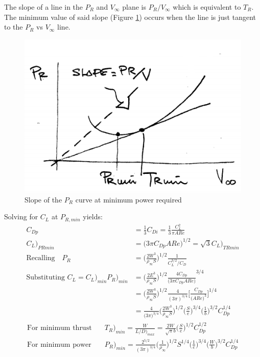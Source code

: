 \documentclass[draft=false, titlepage]{article}
\begin{document}
The slope of a line in the $P_R$ and $V_\infty$ plane is $P_R/V_\infty$ which is equivalent to $T_R$. The minimum value of said slope (Figure \ref{fig:p73_PRMin}) occurs when the line is just tangent to the $P_R$ vs $V_\infty$ line.

\begin{figure}[ht]
	\centering
	\includegraphics[width=0.5\linewidth]{Figures/p73_PRMin.PNG}
	\caption{Slope of the $P_R$ curve at minimum power required}
	\label{fig:p73_PRMin}
\end{figure}

Solving for $C_L$ at $P_{R,min}$ yields:
\begin{align*}
C_{Dp} &= \frac{1}{3}C_{Di} = \frac{1}{3}\frac{C_L^2}{\pi AR e}\\
C_L\Big)_{PRmin} &= \big(3\pi C_{Dp} AR e\Big)^{1/2} = \sqrt{3} C_L\big)_{TRmin}\\
\text{Recalling} \quad P_R &= \Big( \frac{2W^3}{\rho_\infty S} \Big)^{1/2}\frac{1}{C_L^{3/2}/C_D}\\
\text{Substituting } C_L = C_L\big)_{min} 
P_R\Big)_{min} &= \Big(\frac{2E^3}{\rho_\infty S}\Big)^{1/2} \frac{4C_{Dp}}{\big(3\pi C_{Dp} AR e\big)}^{3/4}\\
&= \Big(\frac{2W^3}{\rho_\infty S}\Big)^{1/2} \frac{4}{(3\pi)^{3/4}}\Big[\frac{C_{Dp}}{\big(AR e\big)^3}\Big]^{1/4}\\
	&= \frac{4}{\big(3\pi\big)^{3/4}}\Big(\frac{2W^3}{\rho_\infty S} \Big)^{1/2} \Big(\frac{S}{e}\Big)^{3/4} \Big(\frac{1}{b}\Big)^{3/2} C_{Dp}^{1/4}
\end{align*}
\begin{align*}
\text{For minimum thrust} &\quad T_R\Big)_{min} = \frac{W}{L/D\big)_{max}} = \frac{2W}{\sqrt{\pi}b}\Big(\frac{S}{e}\Big)^{1/2} C_{Dp}^{1/2}\\
\text{For minimum power} &\quad P_R\Big)_{min} = \frac{2^{5/2}}{(3\pi)^{3/4}}
\Big(\frac{1}{\rho_\infty}\Big)^{1/2} S^{1/4} \Big(\frac{1}{e}\Big)^{3/4} \Big(\frac{W}{b}\Big)^{3/2}C_{Dp}^{1/4}
\end{align*}
\end{document}
